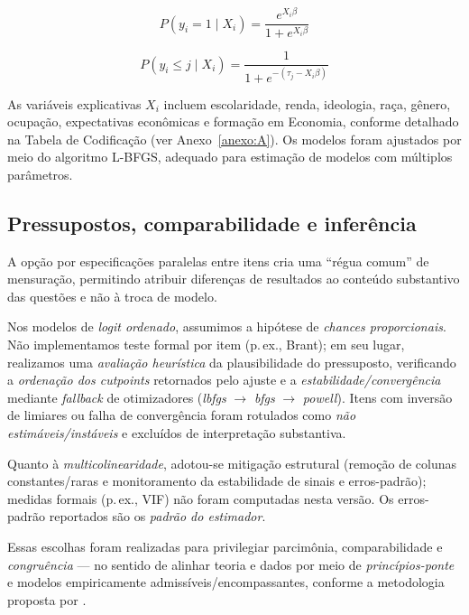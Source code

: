 \begin{equation}
P(y_i = 1 \mid X_i) = \frac{e^{X_i \beta}}{1 + e^{X_i \beta}}
\end{equation}

\begin{equation}
P(y_i \leq j \mid X_i) = \frac{1}{1 + e^{-(\tau_j - X_i \beta)}}
\end{equation}



As variáveis explicativas \(X_i\) incluem escolaridade, renda, ideologia, raça, gênero, ocupação, expectativas econômicas e formação em Economia, conforme detalhado na Tabela de Codificação (ver Anexo~\ref{anexo:A}). Os modelos foram ajustados por meio do algoritmo L-BFGS, adequado para estimação de modelos com múltiplos parâmetros.

\subsection{Pressupostos, comparabilidade e inferência}\label{sec:pressupostos-inferencia}
A opção por especificações paralelas entre itens cria uma “régua comum” de mensuração, permitindo atribuir diferenças de resultados ao conteúdo substantivo das questões e não à troca de modelo. 

Nos modelos de \textit{logit ordenado}, assumimos a hipótese de \textit{chances proporcionais}. Não implementamos teste formal por item (p.\,ex., Brant); em seu lugar, realizamos uma \textit{avaliação heurística} da plausibilidade do pressuposto, verificando a \textit{ordenação dos cutpoints} retornados pelo ajuste e a \textit{estabilidade/convergência} mediante \textit{fallback} de otimizadores (\textit{lbfgs} $\rightarrow$ \textit{bfgs} $\rightarrow$ \textit{powell}). Itens com inversão de limiares ou falha de convergência foram rotulados como \textit{não estimáveis/instáveis} e excluídos de interpretação substantiva.

Quanto à \textit{multicolinearidade}, adotou-se mitigação estrutural (remoção de colunas constantes/raras e monitoramento da estabilidade de sinais e erros-padrão); medidas formais (p.\,ex., VIF) não foram computadas nesta versão. Os erros-padrão reportados são os \textit{padrão do estimador}. 

Essas escolhas foram realizadas para privilegiar parcimônia, comparabilidade e \textit{congruência} --- no sentido de alinhar teoria e dados por meio de \textit{princípios-ponte} e modelos empiricamente admissíveis/encompassantes, conforme a metodologia proposta por .

